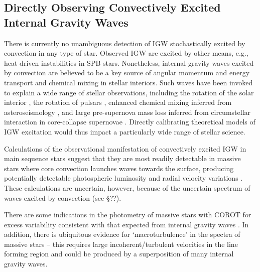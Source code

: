 {\color{blue}
\subsection{Directly Observing Convectively Excited Internal Gravity Waves}}

There is currently no unambiguous detection of IGW stochastically excited by convection in any type of star. Observed IGW are excited by other means, e.g., heat driven instabilities in SPB stars. Nonetheless, internal gravity waves excited by convection are believed to be a key source of angular momentum and energy transport and chemical mixing in stellar interiors.  Such waves have been invoked to explain a wide range of stellar observations, including the rotation of the solar interior \citep{Kumar_1999}, the rotation of pulsars \citep{fullerwave:15}, enhanced chemical mixing inferred from asteroseismology \citep{moravveji:15}, and large pre-supernova mass loss inferred from circumstellar interaction in core-collapse supernovae \citep{quataert:12}.   Directly calibrating theoretical models of IGW excitation would thus impact a particularly wide range of stellar science.

Calculations of the observational manifestation of convectively excited IGW in main sequence stars suggest that they are most readily detectable in massive stars where core convection launches waves towards the surface, producing potentially detectable photospheric luminosity and radial velocity variations \citep{samadi2010,shiode2013}. These calculations are uncertain, however, because of the uncertain spectrum of waves excited by convection (see \S ??).   

There are some indications in the photometry of massive stars with COROT for excess variability consistent with that expected from internal gravity waves \citep{Aerts2015}.   In addition, there is ubiquitous evidence for `macroturbulence' in the spectra of massive stars -- this requires large incoherent/turbulent velocities in the line forming region and could be produced by a superposition of many internal gravity waves.

